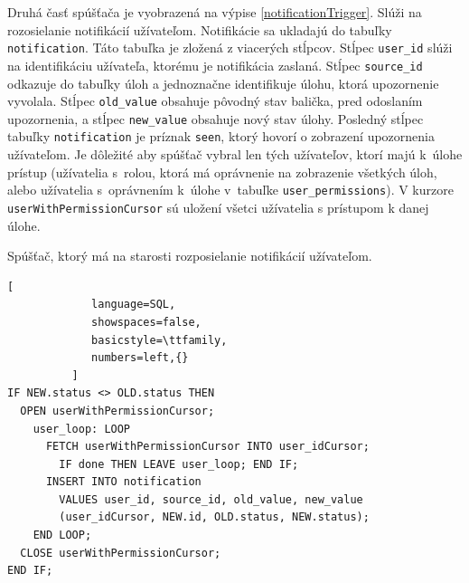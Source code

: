 \documentclass[zadani,slovak]{fitthesis}
\begin{document}
Druhá časť spúšťača je vyobrazená na výpise \ref{notificationTrigger}. Slúži na rozosielanie notifikácií užívateľom. Notifikácie sa ukladajú do tabuľky \texttt{notification}. Táto tabuľka je zložená z viacerých stĺpcov. Stĺpec \texttt{user\_id} slúži na identifikáciu užívateľa, ktorému je notifikácia zaslaná. Stĺpec \texttt{source\_id} odkazuje do tabuľky úloh a jednoznačne identifikuje úlohu, ktorá upozornenie vyvolala. Stĺpec \texttt{old\_value} obsahuje pôvodný stav balička, pred odoslaním upozornenia, a stĺpec \texttt{new\_value} obsahuje nový stav úlohy. Posledný stĺpec tabuľky \texttt{notification} je príznak \texttt{seen}, ktorý hovorí o zobrazení upozornenia užívateľom. Je dôležité aby spúšťač vybral len tých užívateľov, ktorí majú k~úlohe prístup (užívatelia s~rolou, ktorá má oprávnenie na zobrazenie všetkých úloh, alebo užívatelia s~oprávnením k~úlohe v~tabuľke \texttt{user\_permissions}). V kurzore \texttt{userWithPermissionCursor} sú uložení všetci užívatelia s prístupom k danej úlohe.
\begin{algorithm}[H]
  \caption{Spúšťač, ktorý má na starosti rozposielanie notifikácií užívateľom.}
  \label{notificationTrigger}
  \begin{lstlisting}[
             language=SQL,
             showspaces=false,
             basicstyle=\ttfamily,
             numbers=left,{}
          ]
IF NEW.status <> OLD.status THEN 
  OPEN userWithPermissionCursor; 
    user_loop: LOOP
      FETCH userWithPermissionCursor INTO user_idCursor;
        IF done THEN LEAVE user_loop; END IF;
      INSERT INTO notification 
        VALUES user_id, source_id, old_value, new_value
        (user_idCursor, NEW.id, OLD.status, NEW.status);
    END LOOP;
  CLOSE userWithPermissionCursor;
END IF;
  \end{lstlisting}
\end{algorithm}
\end{document}
